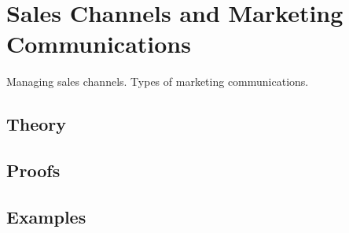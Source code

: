 
\section{Sales Channels and Marketing Communications}
\label{sec:2.6.03-sales-channels}

\begin{ticket}
Managing sales channels. Types of marketing communications.
\end{ticket}

\subsection*{Theory}

\subsection*{Proofs}

\subsection*{Examples}
